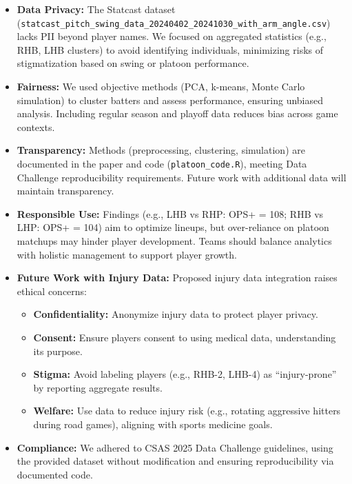 \documentclass[
]{article}
\providecommand{\tightlist}{%
  \setlength{\itemsep}{0pt}\setlength{\parskip}{0pt}}
\begin{document}
\begin{itemize}
\item
  \textbf{Data Privacy:} The Statcast dataset
  (\texttt{statcast\_pitch\_swing\_data\_20240402\_20241030\_with\_arm\_angle.csv})
  lacks PII beyond player names. We focused on aggregated statistics
  (e.g., RHB, LHB clusters) to avoid identifying individuals, minimizing
  risks of stigmatization based on swing or platoon performance.
\item
  \textbf{Fairness:} We used objective methods (PCA, k-means, Monte
  Carlo simulation) to cluster batters and assess performance, ensuring
  unbiased analysis. Including regular season and playoff data reduces
  bias across game contexts.
\item
  \textbf{Transparency:} Methods (preprocessing, clustering, simulation)
  are documented in the paper and code (\texttt{platoon\_code.R}),
  meeting Data Challenge reproducibility requirements. Future work with
  additional data will maintain transparency.
\item
  \textbf{Responsible Use:} Findings (e.g., LHB vs RHP: OPS+ = 108; RHB
  vs LHP: OPS+ = 104) aim to optimize lineups, but over-reliance on
  platoon matchups may hinder player development. Teams should balance
  analytics with holistic management to support player growth.
\item
  \textbf{Future Work with Injury Data:} Proposed injury data
  integration raises ethical concerns:

  \begin{itemize}
  \tightlist
  \item
    \textbf{Confidentiality:} Anonymize injury data to protect player
    privacy.
  \item
    \textbf{Consent:} Ensure players consent to using medical data,
    understanding its purpose.
  \item
    \textbf{Stigma:} Avoid labeling players (e.g., RHB-2, LHB-4) as
    ``injury-prone'' by reporting aggregate results.
  \item
    \textbf{Welfare:} Use data to reduce injury risk (e.g., rotating
    aggressive hitters during road games), aligning with sports medicine
    goals.
  \end{itemize}
\item
  \textbf{Compliance:} We adhered to CSAS 2025 Data Challenge
  guidelines, using the provided dataset without modification and
  ensuring reproducibility via documented code.
\end{itemize}
\end{document}
